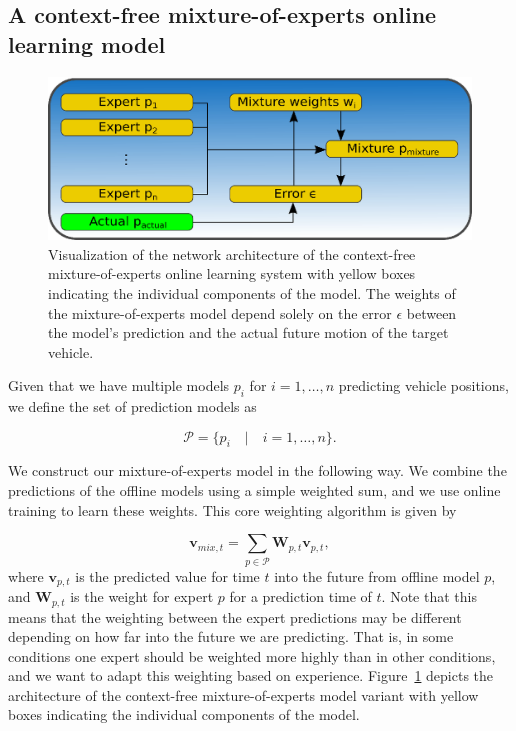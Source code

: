 \subsection{A context-free mixture-of-experts online learning model}%
\label{subsec:a_context_free_mixture_of_experts_online_learning_model}
\begin{figure}[t]
    \centering
    \includegraphics[width=0.8\linewidth]{imgs/mix_context_free_system_arch.eps}
    \caption{Visualization of the network architecture of the context-free mixture-of-experts online learning system with yellow boxes indicating the individual components of the model.
    The weights of the mixture-of-experts model depend solely on the error $\epsilon$ between the model's prediction and the actual future motion of the target vehicle.}
    \label{fig:mix_context_free_system_arch}
\end{figure}
Given that we have multiple models $ p_{i}$ for $i=1, \ldots, n$ predicting vehicle positions, we define the set of prediction models as 

\begin{equation}
\label{eq:mix_pred_model_set}
\mathcal{P} = \{ p_{i}  \quad | \quad i=1, \ldots, n \}.
\end{equation}

We construct our mixture-of-experts model in the following way.
We combine the predictions of the offline models using a simple weighted sum, and we use online training to learn these weights.
This core weighting algorithm is given by 

\begin{equation}
\label{eq:mix_weighting}
\mathbf{v}_{mix,t} = \sum\limits_{ p \in \mathcal{P}} \mathbf{W}_{ p ,t} \mathbf{v}_{ p ,t},
\end{equation}
where $\mathbf{v}_{ p ,t}$ is the predicted value for time $t$ into the future from offline model $p$, and $\mathbf{W}_{ p ,t}$ is the weight for expert $p$ for a prediction time of $t$.
Note that this means that the weighting between the expert predictions may be different depending on how far into the future we are predicting.
That is, in some conditions one expert should be weighted more highly than in other conditions, and we want to adapt this weighting based on experience.
Figure~\ref{fig:mix_context_free_system_arch} depicts the architecture of the context-free mixture-of-experts model variant with yellow boxes indicating the individual components of the model.

